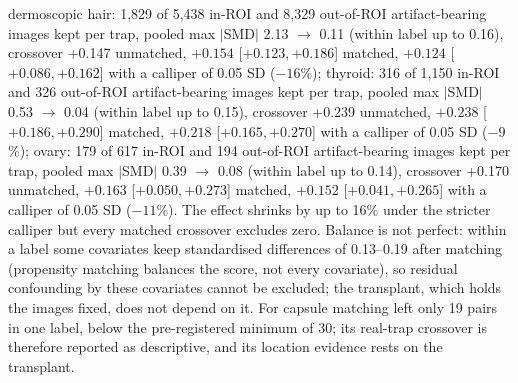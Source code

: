 dermoscopic hair: 1,829 of 5,438 in-ROI and 8,329 out-of-ROI artifact-bearing images kept per trap, pooled max $|$SMD$|$ 2.13 $\to$ 0.11 (within label up to 0.16), crossover +0.147 unmatched, $+0.154$ [$+0.123, +0.186$] matched, $+0.124$ [$+0.086, +0.162$] with a calliper of 0.05 SD ($-16$\%); thyroid: 316 of 1,150 in-ROI and 326 out-of-ROI artifact-bearing images kept per trap, pooled max $|$SMD$|$ 0.53 $\to$ 0.04 (within label up to 0.15), crossover +0.239 unmatched, $+0.238$ [$+0.186, +0.290$] matched, $+0.218$ [$+0.165, +0.270$] with a calliper of 0.05 SD ($-9$\%); ovary: 179 of 617 in-ROI and 194 out-of-ROI artifact-bearing images kept per trap, pooled max $|$SMD$|$ 0.39 $\to$ 0.08 (within label up to 0.14), crossover +0.170 unmatched, $+0.163$ [$+0.050, +0.273$] matched, $+0.152$ [$+0.041, +0.265$] with a calliper of 0.05 SD ($-11$\%). The effect shrinks by up to 16\% under the stricter calliper but every matched crossover excludes zero. Balance is not perfect: within a label some covariates keep standardised differences of 0.13--0.19 after matching (propensity matching balances the score, not every covariate), so residual confounding by these covariates cannot be excluded; the transplant, which holds the images fixed, does not depend on it. For capsule matching left only 19 pairs in one label, below the pre-registered minimum of 30; its real-trap crossover is therefore reported as descriptive, and its location evidence rests on the transplant.%
